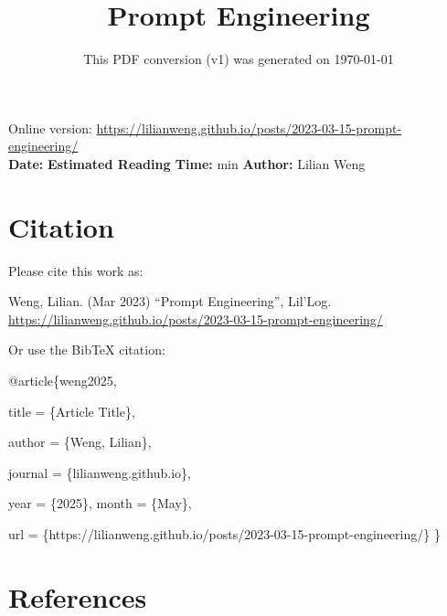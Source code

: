 \documentclass[12pt]{article}
\title{Prompt Engineering}
\date{This PDF conversion (v1) was generated on \today\footnotemark}
\begin{document}
\maketitle
\begin{center}
    Online version: \url{https://lilianweng.github.io/posts/2023-03-15-prompt-engineering/} \\
    \textbf{Date:} \quad
    \textbf{Estimated Reading Time:}  min \quad
    \textbf{Author:} Lilian Weng
\end{center}




\newpage
\tableofcontents
\newpage
\vspace{1em}
\n\n\n\section{Citation}
Please cite this work as:

\begin{tcolorbox}[colback=black!5!white, colframe=black!80!white, boxrule=0.5pt, arc=2mm, left=1mm, right=1mm, top=1mm, bottom=1mm]
  Weng, Lilian. (Mar 2023) ``Prompt Engineering'', Lil'Log. \url{https://lilianweng.github.io/posts/2023-03-15-prompt-engineering/}
  \end{tcolorbox}

Or use the BibTeX citation:

\begin{tcolorbox}[
    colback=black!5!white,
    colframe=black!80!white,
    boxrule=0.5pt,
    arc=2mm,
    left=1mm,
    right=1mm,
    top=1mm,
    bottom=1mm,
    listing only,
    listing options={
      basicstyle=\ttfamily\footnotesize,
      breaklines=true,
      literate={\{}{{\char`\{}}1 {\}}{{\char`\}}}1
    }
  ]
  @article\{weng2025,

    title   = \{Article Title\},

    author  = \{Weng, Lilian\},

    journal = \{lilianweng.github.io\},

    year    = \{2025\},
    month   = \{May\},

    url     = \{https://lilianweng.github.io/posts/2023-03-15-prompt-engineering/\}\n
  \}
  \end{tcolorbox}

\newpage
\section{References}

\n
\end{document}

